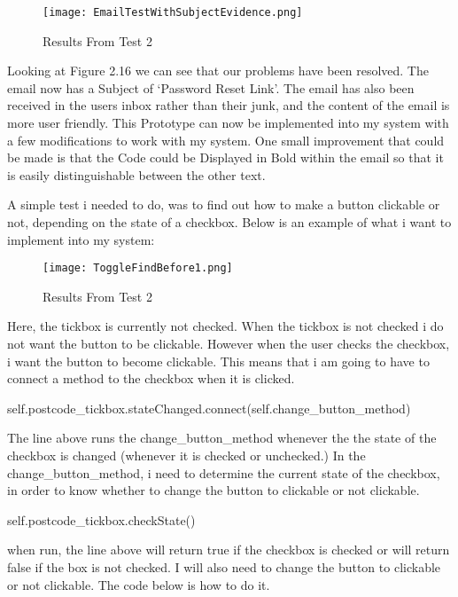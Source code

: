 \begin{figure}[H]
\caption{Results From Test 2} \label{fig:Results From Test 2}
\hfill\texttt{[image: EmailTestWithSubjectEvidence.png]}\hspace*{\fill}
\end{figure}

Looking at Figure 2.16 we can see that our problems have been resolved. The email now has a Subject of `Password Reset Link'. The email has also been received in the users inbox rather than their junk, and the content of the email is more user friendly. This Prototype can now be implemented into my system with a few modifications to work with my system. One small improvement that could be made is that the Code could be Displayed in Bold within the email so that it is easily distinguishable between the other text. \par
\pagebreak


A simple test i needed to do, was to find out how to make a button clickable or not, depending on the state of a checkbox. Below is an example of what i want to implement into my system:

\begin{figure}[H]
\caption{Results From Test 2} \label{fig:Results From Test 2}
\hfill\texttt{[image: ToggleFindBefore1.png]}\hspace*{\fill}
\end{figure}

Here, the tickbox is currently not checked. When the tickbox is not checked i do not want the button to be clickable. However when the user checks the checkbox, i want the button to become clickable. This means that i am going to have to connect a method to the checkbox when it is clicked.
\begin{python}
self.postcode_tickbox.stateChanged.connect(self.change_button_method)
\end{python}
The line above runs the change_button_method whenever the the state of the checkbox is changed (whenever it is checked or unchecked.) In the change_button_method, i need to determine the current state of the checkbox, in order to know whether to change the button to clickable or not clickable.

\begin{python}
self.postcode_tickbox.checkState()
\end{python}

when run, the line above will return true if the checkbox is checked or will return false if the box is not checked. I will also need to change the button to clickable or not clickable. The code below is how to do it.

